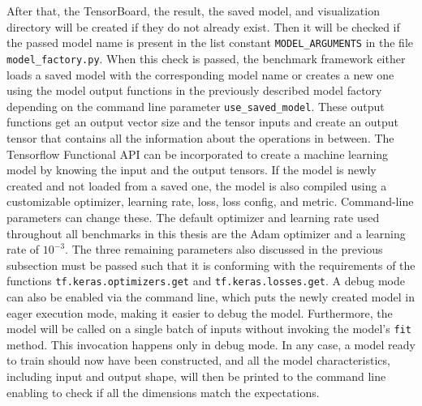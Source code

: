 \documentclass[draft,final]{vutinfth} %
\begin{document}
After that, the TensorBoard, the result, the saved model, and visualization directory will be created if they do not already exist.
Then it will be checked if the passed model name is present in the list constant \texttt{MODEL\_ARGUMENTS} in the file \texttt{model\_factory.py}.
When this check is passed, the benchmark framework either loads a saved model with the corresponding model name or creates a new one using the model output functions in the previously described model factory depending on the command line parameter \texttt{use\_saved\_model}.
These output functions get an output vector size and the tensor inputs and create an output tensor that contains all the information about the operations in between.
The Tensorflow \cite{Tensorflow} Functional API can be incorporated to create a machine learning model by knowing the input and the output tensors.
If the model is newly created and not loaded from a saved one, the model is also compiled using a customizable optimizer, learning rate, loss, loss config, and metric.
Command-line parameters can change these.
The default optimizer and learning rate used throughout all benchmarks in this thesis are the Adam optimizer \cite{Adam} and a learning rate of $10^{-3}$.
The three remaining parameters also discussed in the previous subsection must be passed such that it is conforming with the requirements of the functions \texttt{tf.keras.optimizers.get} and \texttt{tf.keras.losses.get}.
A debug mode can also be enabled via the command line, which puts the newly created model in eager execution mode, making it easier to debug the model. Furthermore, the model will be called on a single batch of inputs without invoking the model's \texttt{fit} method. This invocation happens only in debug mode.
In any case, a model ready to train should now have been constructed, and all the model characteristics, including input and output shape, will then be printed to the command line enabling to check if all the dimensions match the expectations.
\end{document}
